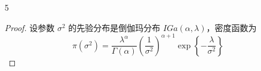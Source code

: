 \documentclass[normal,founder,mtpro2,cn]{elegantnote}
\begin{document}
\begin{enumerate}
\begin{proof}
            可得样本 $x_{1},x_{2},\ldots,x_{n}$ 的边际分布为
            \begin{equation*}
                \begin{aligned}
                    m(x_{1},x_{2},\ldots,x_{n})= & \int_{-\infty}^{+\infty}\frac{\beta^{\alpha}\cdot\lambda^{\sum_{i=1}^{n}x_{i}+\alpha-1}}{\Gamma(\alpha)\cdot x_{1}!\ldots x_{n}!}\mathrm{e}^{-\lambda\left(\beta+n\right)}\cdot\mathrm{I}_{\lambda>0}\,\mathrm{d}\lambda \\
                    =                            & \frac{\beta^{\alpha}}{\Gamma(\alpha)\cdot x_{1}!\ldots x_{n}!}\cdot\int_{0}^{+\infty}\lambda^{\sum_{i=1}^{n}x_{i}+\alpha-1}\mathrm{e}^{-\lambda\left(\beta+n\right)}\,\mathrm{d}\lambda                                  \\
                    =                            & \frac{\beta^{\alpha}}{\Gamma(\alpha)\cdot x_{1}!\ldots x_{n}!}\cdot\frac{\Gamma\left(\sum_{i=1}^{n}x_{i}+\alpha\right)}{(\beta+n)^{\sum_{i=1}^{n}x_{i}+\alpha}}
                \end{aligned}
            \end{equation*}

            因此 $\lambda$ 的后验分布为
            \begin{equation*}
                \pi\left(\lambda\mid x_{1},x_{2},\ldots,x_{n}\right)=\frac{(\beta+n)^{\sum_{i=1}^{n}x_{i}+\alpha}}{\Gamma\left(\sum_{i=1}^{n}x_{i}+\alpha\right)} \lambda^{\sum_{i=1}^{n}x_{i}+\alpha-1} \mathrm{e}^{-(n+\beta) \lambda},\quad\lambda>0
            \end{equation*}

            即，
            \begin{equation*}
                \lambda\mid x_{1},x_{2},\ldots,x_{n}\sim\text{Ga}\left(\sum_{i=1}^{n}x_{i}+\alpha,\beta+n\right)
            \end{equation*}

            故，伽玛分布是泊松分布的均值 $\lambda$ 的共轭先验分布。
        \end{proof}
    \item[5]
        \begin{proof}
            设参数 $\sigma^{2}$ 的先验分布是倒伽玛分布 $IGa(\alpha,\lambda)$，密度函数为
            \begin{equation*}
                \pi\left(\sigma^{2}\right)=\frac{\lambda^{\alpha}}{\Gamma(\alpha)}\left(\frac{1}{\sigma^{2}}\right)^{\alpha+1}\exp\left\{-\frac{\lambda}{\sigma^{2}}\right\}
            \end{equation*}


\end{proof}
\end{enumerate}
\end{document}

